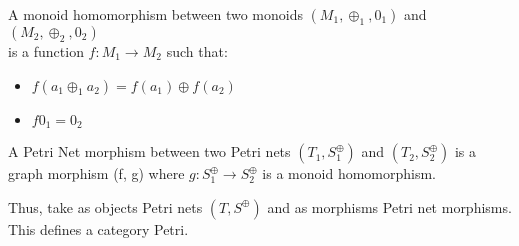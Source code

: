 %
\begin{definition}
\label{Monoid-Homomorphism}
A monoid homomorphism between two monoids $(M_1, \oplus_1, 0_1)$ and $(M_2, \oplus_2, 0_2)$\\
 is a function $f: M_1 \rightarrow M_2$ such that:\\
\begin{itemize}
\setlength\itemsep{.1em}
\item $f(a_1 \oplus_1 a_2) = f(a_1) \oplus f(a_2)$
\item $f 0_1 = 0_2$
\end{itemize}
\end{definition}
%
\begin{definition}
\label{Petri-net-morphism}
A Petri Net morphism between two Petri nets $(T_1, S_1^\oplus)$ and $(T_2, S_2^\oplus)$ is a graph morphism (f, g) where $g: S_1^\oplus \rightarrow S_2^\oplus$ is a monoid homomorphism.\\
\end{definition}
Thus, take as objects Petri nets $(T, S^\oplus)$ and as morphisms Petri net morphisms. This defines a category Petri.\\
